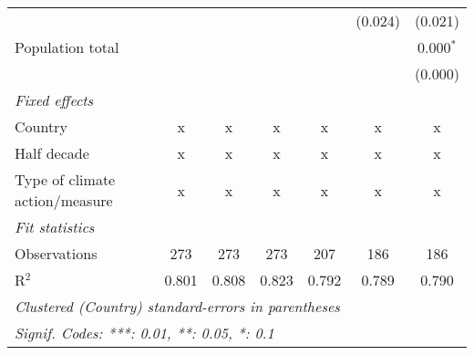 \begin{tabular}{lcccccc}
                                                                                          &         &               &                &                & (0.024)        & (0.021)\\   
   Population total                                                                       &         &               &                &                &                & 0.000$^{*}$\\   
                                                                                          &         &               &                &                &                & (0.000)\\   
   \emph{Fixed effects}\\
   Country                                                                                & x       & x             & x              & x              & x              & x\\  
   Half decade                                                                            & x       & x             & x              & x              & x              & x\\  
   Type of climate action/measure                                                         & x       & x             & x              & x              & x              & x\\  
   \midrule \emph{Fit statistics}\\
   Observations                                                                           & 273     & 273           & 273            & 207            & 186            & 186\\  
   R$^2$                                                                                  & 0.801   & 0.808         & 0.823          & 0.792          & 0.789          & 0.790\\  
   \midrule
   \multicolumn{7}{l}{\emph{Clustered (Country) standard-errors in parentheses}}\\
   \multicolumn{7}{l}{\emph{Signif. Codes: ***: 0.01, **: 0.05, *: 0.1}}\\
\end{tabular}
\par\endgroup


